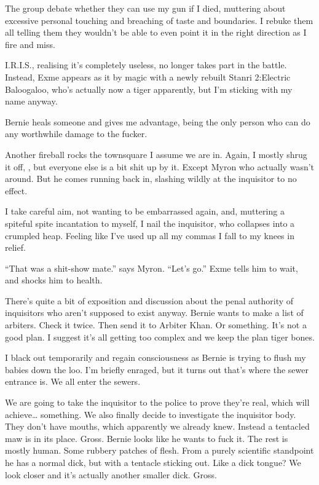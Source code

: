 The group debate whether they can use my gun if I died, muttering about excessive personal touching and breaching of taste and boundaries. I rebuke them all telling them they wouldn’t be able to even point it in the right direction as I fire and miss.\medskip

I.R.I.S., realising it’s completely useless, no longer takes part in the battle. Instead, Exme appears as it by magic with a newly rebuilt Stanri 2:Electric Baloogaloo, who’s actually now a tiger apparently, but I’m sticking with my name anyway.\medskip

Bernie heals someone and gives me advantage, being the only person who can do any worthwhile damage to the fucker.\medskip

Another fireball rocks the townsquare I assume we are in. Again, I mostly shrug it off, , but everyone else is a bit shit up by it. Except Myron who actually wasn’t around. But he comes running back in, slashing wildly at the inquisitor to no effect.\medskip

I take careful aim, not wanting to be embarrassed again, and, muttering a spiteful spite incantation to myself, I nail the inquisitor, who collapses into a crumpled heap. Feeling like I’ve used up all my commas I fall to my knees in relief.\medskip

“That was a shit-show mate.” says Myron. “Let’s go.” Exme tells him to wait, and shocks him to health.\medskip

There’s quite a bit of exposition and discussion about the penal authority of inquisitors who aren’t supposed to exist anyway. Bernie wants to make a list of arbiters. Check it twice. Then send it to Arbiter Khan. Or something. It’s not a good plan. I suggest it’s all getting too complex and we keep the plan tiger bones.\medskip

I black out temporarily and regain consciousness as Bernie is trying to flush my babies down the loo. I’m briefly enraged, but it turns out that’s where the sewer entrance is. We all enter the sewers.\medskip

We are going to take the inquisitor to the police to prove they’re real, which will achieve… something. We also finally decide to investigate the inquisitor body. They don’t have mouths, which apparently we already knew. Instead a tentacled maw is in its place. Gross. Bernie looks like he wants to fuck it. The rest is mostly human. Some rubbery patches of flesh. From a purely scientific standpoint he has a normal dick, but with a tentacle sticking out. Like a dick tongue? We look closer and it’s actually another smaller dick. Gross.\medskip

